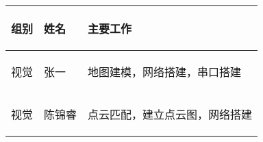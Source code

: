 
\begin{longtable}{ p{2cm} | p{3.5cm} | p{9.3cm} |}

    \hline

    \endfoot
    
    \rowcolor{tabhdcolor}

        \begin{center}
            组别
        \end{center} &
        \begin{center}
            姓名
        \end{center} &
        \begin{center}
            主要工作
        \end{center} \\

    \hline

    \endhead

        \begin{center}
            视觉
        \end{center} &
        \begin{center}
            张一
        \end{center} &
        \begin{center}
            地图建模，网络搭建，串口搭建
        \end{center}  \\
        
    \hline
        \begin{center}
            视觉
        \end{center}&
        \begin{center}
            陈锦睿
        \end{center}&
        \begin{center}
            点云匹配，建立点云图，网络搭建
        \end{center}\\


\end{longtable}
